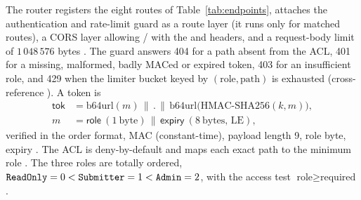 The router registers the eight routes of Table~\ref{tab:endpoints}, attaches
the authentication and rate-limit guard as a route layer (it runs only for
matched routes), a CORS layer allowing / with the
 and  headers, and a request-body limit
of $1\,048\,576$ bytes
. The guard
answers 404 for a path absent from the ACL, 401 for a missing, malformed,
badly MACed or expired token, 403 for an insufficient role, and 429 when the
limiter bucket keyed by $(\text{role}, \text{path})$ is exhausted
 (cross-reference ).
A token is
\begin{align}
  \mathsf{tok} &= \mathrm{b64url}(m) \,\|\, \texttt{.} \,\|\, \mathrm{b64url}\bigl(\mathrm{HMAC\text{-}SHA256}(k, m)\bigr), \\
  m &= \mathsf{role}\ (1\ \text{byte}) \,\|\, \mathsf{expiry}\ (8\ \text{bytes, LE}),
\end{align}
verified in the order format, MAC (constant-time), payload length 9, role
byte, expiry .
The ACL is deny-by-default and maps each exact path to the minimum role
. The three roles are totally ordered,
$\texttt{ReadOnly} = 0 < \texttt{Submitter} = 1 < \texttt{Admin} = 2$, with the access
test $\text{role} \ge \text{required}$
.

